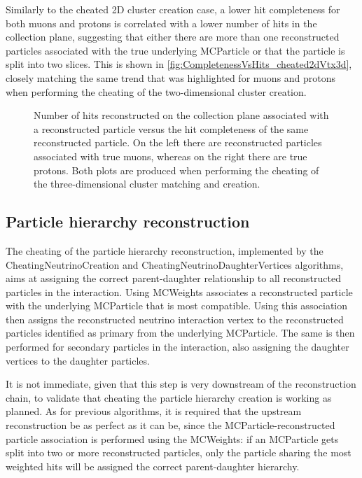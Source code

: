 Similarly to the cheated 2D cluster creation case, a lower hit completeness for both muons and protons is correlated with a lower number of hits in the collection plane, suggesting that either there are more than one reconstructed particles associated with the true underlying MCParticle or that the particle is split into two slices. This is shown in \autoref{fig:CompletenessVsHits_cheated2dVtx3d}, closely matching the same trend that was highlighted for muons and protons when performing the cheating of the two-dimensional cluster creation. 

\begin{figure}
    \centering
    \caption[Hit completeness versus number of hits on collection plane]{Number of hits reconstructed on the collection plane associated with a reconstructed particle versus the hit completeness of the same reconstructed particle. On the left there are reconstructed particles associated with true muons, whereas on the right there are true protons. Both plots are produced when performing the cheating of the three-dimensional cluster matching and creation. }
    \label{fig:CompletenessVsHits_cheated2dVtx3d}
\end{figure}

\subsection{Particle hierarchy reconstruction} 

The cheating of the particle hierarchy reconstruction, implemented by the CheatingNeutrinoCreation and CheatingNeutrinoDaughterVertices algorithms, aims at assigning the correct parent-daughter relationship to all reconstructed particles in the interaction. Using MCWeights associates a reconstructed particle with the underlying MCParticle that is most compatible. Using this association then assigns the reconstructed neutrino interaction vertex to the reconstructed particles identified as primary from the underlying MCParticle. The same is then performed for secondary particles in the interaction, also assigning the daughter vertices to the daughter particles. 

It is not immediate, given that this step is very downstream of the reconstruction chain, to validate that cheating the particle hierarchy creation is working as planned. As for previous algorithms, it is required that the upstream reconstruction be as perfect as it can be, since the MCParticle-reconstructed particle association is performed using the MCWeights: if an MCParticle gets split into two or more reconstructed particles, only the particle sharing the most weighted hits will be assigned the correct parent-daughter hierarchy.

